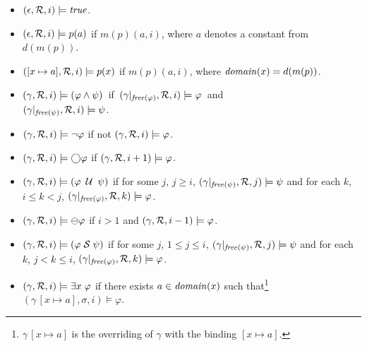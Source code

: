 \begin{itemize}

\item $( \epsilon , {\cal R} , i ) \models \mathit{true}$.

\item $( \epsilon ,  {\cal R} , i )
 \models p ( a ) $ if $m(p) ( a, i )$, where $a$ denotes a constant from  $d(m(p))$.

\item $( [ x \mapsto a ] , {\cal R} , i ) \models p ( x )$ if $m(p)  ( a , i )$, where $\mathit{domain} (x) = d ( m ( p ))$.

\item $( \gamma,  {\cal R} , i ) \models ( \varphi \wedge \psi ) $~if~$(
\gamma |_{\mathit{free}  ( \varphi )} , {\cal R} , i ) \models \varphi$~and  \\
$( \gamma |_{\mathit{free} ( \psi ) } , {\cal R} , i ) \models \psi$. 

\item $( \gamma , {\cal R} , i ) \models \neg \varphi$ if not $( \gamma , {\cal R} , i ) 
\models \varphi$.

\item $( \gamma , {\cal R} , i) \models \bigcirc \varphi$ if 
$(\gamma , {\cal R} , i + 1) \models
\varphi$.

\item $( \gamma , {\cal R} , i ) \models ( \varphi \; \mathbin{\mathcal{U}} \; \psi )$ if
for some $j$, $j \geq i$, $( \gamma |_{\mathit{free} ( \psi )} , {\cal R} , j) 
\models \psi $ and for each $k$,  $i \leq k < j $,
$( \gamma |_{\mathit{free} ( \varphi )} , {\cal R} , k) \models \varphi$.


\item $( \gamma , {\cal R} , i) \models \ominus \varphi$ if $i>1$ and
$(\gamma , {\cal R} , i-1) \models
\varphi$.

\item $( \gamma , {\cal R} , i ) \models ( \varphi \; {\cal S} \; \psi )$ if
for some $j$, $1 \le j \leq i$, $( \gamma |_{\mathit{free} ( \psi )} , {\cal R} , j) 
\models \psi $ and for each $k$, $j < k \leq i$,
$( \gamma |_{\mathit{free} ( \varphi )} , {\cal R} , k) \models \varphi$.





\item $( \gamma , {\cal R} , i) \models \exists x \; \varphi$ if
there exists $a \in \mathit{domain} ( x )$ such that\footnote{$\gamma \, [ x \mapsto a ]$
is the overriding of $\gamma$ with the binding $[ x \mapsto a ]$.}
$( \gamma \, [ x \mapsto a ], \sigma , i) \models \varphi$.

\end{itemize}

